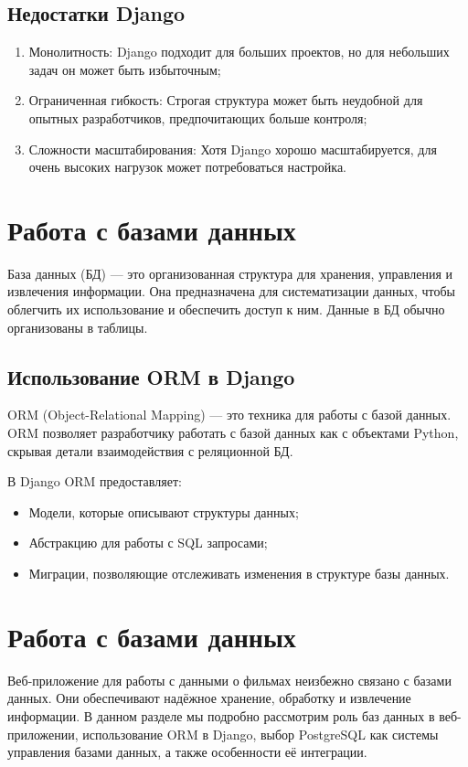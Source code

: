 \subsection*{Недостатки Django}
\begin{enumerate}
    \item Монолитность: Django подходит для больших проектов, но для небольших задач он может быть избыточным;
    \item Ограниченная гибкость: Строгая структура может быть неудобной для опытных разработчиков, предпочитающих больше контроля;
    \item Сложности масштабирования: Хотя Django хорошо масштабируется, для очень высоких нагрузок может потребоваться настройка.
\end{enumerate}

\section{Работа с базами данных}
База данных (БД) — это организованная структура для хранения, управления и извлечения информации. Она предназначена для систематизации данных, чтобы облегчить их использование и обеспечить доступ к ним. Данные в БД обычно организованы в таблицы.

\subsection*{Использование ORM в Django}
ORM (Object-Relational Mapping) — это техника для работы с базой данных. ORM позволяет разработчику работать с базой данных как с объектами Python, скрывая детали взаимодействия с реляционной БД.

В Django ORM предоставляет:
\begin{itemize}
    \item Модели, которые описывают структуры данных;
    \item Абстракцию для работы с SQL запросами;
    \item Миграции, позволяющие отслеживать изменения в структуре базы данных.
\end{itemize}

\section{Работа с базами данных}
Веб-приложение для работы с данными о фильмах неизбежно связано с базами данных. Они обеспечивают надёжное хранение, обработку и извлечение информации. В данном разделе мы подробно рассмотрим роль баз данных в веб-приложении, использование ORM в Django, выбор PostgreSQL как системы управления базами данных, а также особенности её интеграции.

